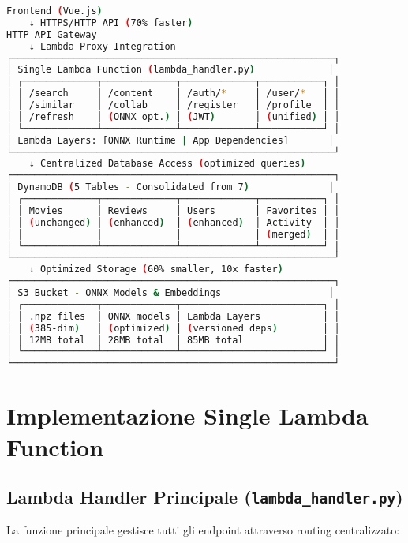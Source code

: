 \documentclass[11pt,a4paper]{article}
\begin{document}
\begin{lstlisting}[language=bash, caption=Flusso di Comunicazione del Sistema]
Frontend (Vue.js) 
    ↓ HTTPS/HTTP API (70% faster)
HTTP API Gateway 
    ↓ Lambda Proxy Integration
┌─────────────────────────────────────────────────────────┐
│ Single Lambda Function (lambda_handler.py)             │
│ ┌─────────────┬─────────────┬─────────────┬───────────┐ │
│ │ /search     │ /content    │ /auth/*     │ /user/*   │ │
│ │ /similar    │ /collab     │ /register   │ /profile  │ │
│ │ /refresh    │ (ONNX opt.) │ (JWT)       │ (unified) │ │
│ └─────────────┴─────────────┴─────────────┴───────────┘ │
│ Lambda Layers: [ONNX Runtime | App Dependencies]       │
└─────────────────────────────────────────────────────────┘
    ↓ Centralized Database Access (optimized queries)
┌─────────────────────────────────────────────────────────┐
│ DynamoDB (5 Tables - Consolidated from 7)              │
│ ┌─────────────┬─────────────┬─────────────┬───────────┐ │
│ │ Movies      │ Reviews     │ Users       │ Favorites │ │
│ │ (unchanged) │ (enhanced)  │ (enhanced)  │ Activity  │ │
│ │             │             │             │ (merged)  │ │
│ └─────────────┴─────────────┴─────────────┴───────────┘ │
└─────────────────────────────────────────────────────────┘
    ↓ Optimized Storage (60% smaller, 10x faster)
┌─────────────────────────────────────────────────────────┐
│ S3 Bucket - ONNX Models & Embeddings                   │
│ ┌─────────────┬─────────────┬─────────────────────────┐ │
│ │ .npz files  │ ONNX models │ Lambda Layers           │ │
│ │ (385-dim)   │ (optimized) │ (versioned deps)        │ │
│ │ 12MB total  │ 28MB total  │ 85MB total              │ │
│ └─────────────┴─────────────┴─────────────────────────┘ │
└─────────────────────────────────────────────────────────┘
\end{lstlisting}

\section{Implementazione Single Lambda Function}

\subsection{Lambda Handler Principale (\texttt{lambda\_handler.py})}
La funzione principale gestisce tutti gli endpoint attraverso routing centralizzato:
\end{document}
